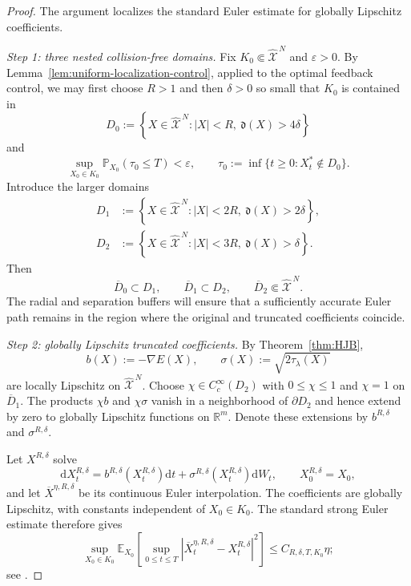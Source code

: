 \documentclass[11pt]{article}
\def\E{\mathbb{E}}
\def\P{\mathbb{P}}
\def\R{\mathbb{R}}
\def\Xc{{\mathcal X}}
\def\hX{\widehat{\Xc}^{\,N}}
\newcommand{\dd}{\mathrm{d}}
\theoremstyle{definition}
\theoremstyle{remark}
\numberwithin{equation}{section}
\begin{document}
\begin{proof}
The argument localizes the standard Euler estimate for globally Lipschitz coefficients.

\smallskip
\noindent\textit{Step 1: three nested collision-free domains.}
Fix $K_0\Subset\hX$ and $\varepsilon>0$.  By
Lemma~\ref{lem:uniform-localization-control}, applied to the optimal feedback control, we may first
choose $R>1$ and then $\delta>0$ so small that $K_0$ is contained in
\[
 D_0:=\left\{X\in\hX:|X|<R,\ \mathfrak d(X)>4\delta\right\}
\]
and
\begin{equation}\label{eq:exact-exit-small-Euler}
 \sup_{X_0\in K_0}\P_{X_0}(\tau_0\le T)<\varepsilon,
 \qquad
 \tau_0:=\inf\{t\ge0:X_t^*\notin D_0\}.
\end{equation}
Introduce the larger domains
\begin{align*}
 D_1&:=\left\{X\in\hX:|X|<2R,\ \mathfrak d(X)>2\delta\right\},\\
 D_2&:=\left\{X\in\hX:|X|<3R,\ \mathfrak d(X)>\delta\right\}.
\end{align*}
Then
\[
 \overline D_0\subset D_1,
 \qquad
 \overline D_1\subset D_2,
 \qquad
 \overline D_2\Subset\hX.
\]
The radial and separation buffers will ensure that a sufficiently accurate Euler path remains in the
region where the original and truncated coefficients coincide.

\smallskip
\noindent\textit{Step 2: globally Lipschitz truncated coefficients.}
By Theorem~\ref{thm:HJB},
\[
 b(X):=-\nabla E(X),
 \qquad
 \sigma(X):=\sqrt{2\tau_\lambda(X)}
\]
are locally Lipschitz on $\hX$.  Choose $\chi\in C_c^\infty(D_2)$ with
$0\le\chi\le1$ and $\chi=1$ on $\overline D_1$.  The products $\chi b$ and $\chi\sigma$ vanish in
a neighborhood of $\partial D_2$ and hence extend by zero to globally Lipschitz functions on
$\R^m$.  Denote these extensions by $b^{R,\delta}$ and $\sigma^{R,\delta}$.

Let $X^{R,\delta}$ solve
\begin{equation}\label{eq:truncated-feedback-SDE-Euler}
 \dd X_t^{R,\delta}
 =b^{R,\delta}(X_t^{R,\delta})\dd t
 +\sigma^{R,\delta}(X_t^{R,\delta})\dd W_t,
 \qquad X_0^{R,\delta}=X_0,
\end{equation}
and let $\overline X^{\eta,R,\delta}$ be its continuous Euler interpolation.  The coefficients are
globally Lipschitz, with constants independent of $X_0\in K_0$.  The standard strong Euler estimate
therefore gives
\begin{equation}\label{eq:global-truncated-Euler-estimate}
 \sup_{X_0\in K_0}
 \E_{X_0}\left[
 \sup_{0\le t\le T}
 |\overline X_t^{\eta,R,\delta}-X_t^{R,\delta}|^2
 \right]
 \le C_{R,\delta,T,K_0}\eta;
\end{equation}
see \cite[Chapter~10]{KloedenPlaten1992}.


\end{proof}
\end{document}
